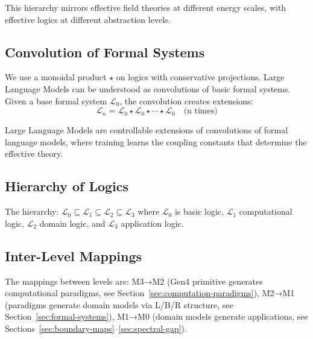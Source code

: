 This hierarchy mirrors effective field theories at different energy scales, with effective logics at different abstraction levels.

\subsection{Convolution of Formal Systems}

\begin{definition}
\label{def:convolution-formal}
We use a monoidal product $\star$ on logics with conservative projections. Large Language Models can be understood as convolutions of basic formal systems. Given a base formal system $\mathcal{L}_0$, the convolution creates extensions:
\[
\mathcal{L}_n = \mathcal{L}_0 \star \mathcal{L}_0 \star \cdots \star \mathcal{L}_0 \quad \text{(n times)}
\]
\end{definition}

\begin{theorem}
\label{thm:llm-formal}
Large Language Models are controllable extensions of convolutions of formal language models, where training learns the coupling constants that determine the effective theory.
\end{theorem}

\subsection{Hierarchy of Logics}

\begin{definition}
\label{def:hierarchy-logics}
The hierarchy: $\mathcal{L}_0 \subseteq \mathcal{L}_1 \subseteq \mathcal{L}_2 \subseteq \mathcal{L}_3$ where $\mathcal{L}_0$ is basic logic, $\mathcal{L}_1$ computational logic, $\mathcal{L}_2$ domain logic, and $\mathcal{L}_3$ application logic.
\end{definition}

\subsection{Inter-Level Mappings}

The mappings between levels are: M3→M2 (Gen4 primitive generates computational paradigms, see Section~\ref{sec:computation-paradigms}), M2→M1 (paradigms generate domain models via L/B/R structure, see Section~\ref{sec:formal-systems}), M1→M0 (domain models generate applications, see Sections~\ref{sec:boundary-maps}--\ref{sec:spectral-gap}).

